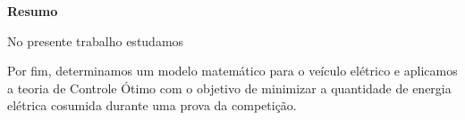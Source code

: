 
\begin{center}
\huge{{\bf Resumo}}
\vspace{2cm}
\end{center}

 


No presente trabalho estudamos

Por fim, determinamos um modelo matemático para o veículo elétrico e 
aplicamos a teoria de Controle Ótimo com o objetivo de minimizar a quantidade
de energia elétrica cosumida durante uma prova da competição.
 
\clearpage
\thispagestyle{empty}
\cleardoublepage

